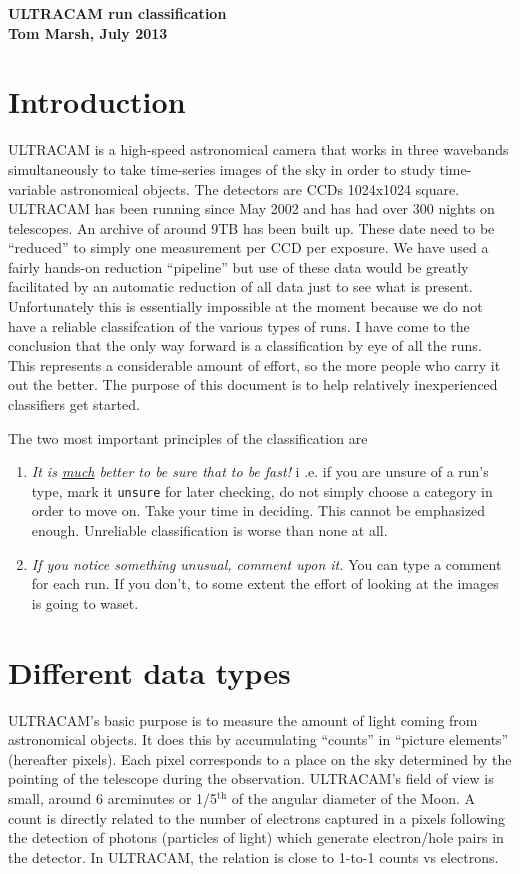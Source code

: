 \documentclass[10pt,a4paper]{article}
\newcommand{\dt}[1]{\texttt{#1}}
\begin{document}
\begin{center}
{\bf\large ULTRACAM run classification}\\
{\bf Tom Marsh, July 2013}
\end{center}

\section{Introduction}
ULTRACAM is a high-speed astronomical camera that works in three wavebands
simultaneously to take time-series images of the sky in order to study
time-variable astronomical objects. The detectors are CCDs 1024x1024 square.
ULTRACAM has been running since May 2002 and has had over 300 nights on
telescopes. An archive of around 9TB has been built up. These date need to be
``reduced'' to simply one measurement per CCD per exposure. We have used a
fairly hands-on reduction ``pipeline'' but use of these data would be greatly
facilitated by an automatic reduction of all data just to see what is
present. Unfortunately this is essentially impossible at the moment because we
do not have a reliable classifcation of the various types of runs. I have come
to the conclusion that the only way forward is a classification by eye of all
the runs. This represents a considerable amount of effort, so the more people
who carry it out the better. The purpose of this document is to help
relatively inexperienced classifiers get started.

The two most important principles of the classification are
\begin{enumerate}
\item \emph{It is \underline{much} better to be sure that to be fast!} i .e. if
  you are unsure of a run's type, mark it \dt{unsure} for later checking, do not
  simply choose a category in order to move on. Take your time in
  deciding. This cannot be emphasized enough. Unreliable classification is
  worse than none at all.

\item \emph{If you notice something unusual, comment upon it.} You can type 
a comment for each run. If you don't, to some extent the effort of looking at
the images is going to waset.
\end{enumerate}

\section{Different data types}
ULTRACAM's basic purpose is to measure the amount of light coming from
astronomical objects. It does this by accumulating ``counts'' in ``picture
elements'' (hereafter pixels). Each pixel corresponds to a place on the sky
determined by the pointing of the telescope during the observation. ULTRACAM's
field of view is small, around 6 arcminutes or 1/5$^\mathrm{th}$ of the
angular diameter of the Moon. A count is directly related to the number of
electrons captured in a pixels following the detection of photons (particles
of light) which generate electron/hole pairs in the detector. In ULTRACAM,
the relation is close to 1-to-1 counts vs electrons.
\end{document}
